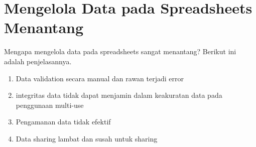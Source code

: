 \section{Mengelola Data pada Spreadsheets Menantang}
Mengapa mengelola data pada spreadsheets sangat menantang? Berikut ini adalah penjelasannya.
\begin{enumerate}
    \item Data validation secara manual dan rawan terjadi error
    \item integritas data tidak dapat menjamin dalam keakuratan data pada penggunaan multi-use
    \item Pengamanan data tidak efektif
    \item Data sharing lambat dan susah untuk sharing
\end{enumerate}

